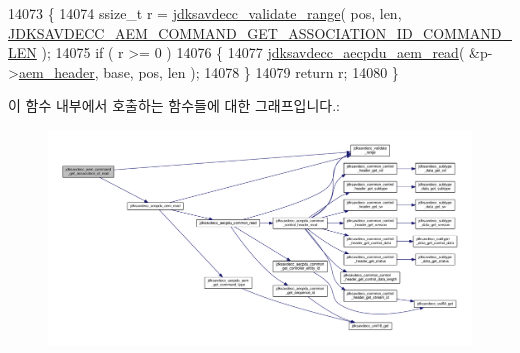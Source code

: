 \begin{DoxyCode}
14073 \{
14074     ssize\_t r = \hyperlink{group__util_ga9c02bdfe76c69163647c3196db7a73a1}{jdksavdecc\_validate\_range}( pos, len, 
      \hyperlink{group__command__get__association__id_ga71a17007be8c4f1ce7ac1c9f36a1f77e}{JDKSAVDECC\_AEM\_COMMAND\_GET\_ASSOCIATION\_ID\_COMMAND\_LEN} 
      );
14075     \textcolor{keywordflow}{if} ( r >= 0 )
14076     \{
14077         \hyperlink{group__aecpdu__aem_gae2421015dcdce745b4f03832e12b4fb6}{jdksavdecc\_aecpdu\_aem\_read}( &p->\hyperlink{structjdksavdecc__aem__command__get__association__id_ae1e77ccb75ff5021ad923221eab38294}{aem\_header}, base, pos, len );
14078     \}
14079     \textcolor{keywordflow}{return} r;
14080 \}
\end{DoxyCode}


이 함수 내부에서 호출하는 함수들에 대한 그래프입니다.\+:
\nopagebreak
\begin{figure}[H]
\begin{center}
\leavevmode
\includegraphics[width=350pt]{group__command__get__association__id_ga956fff2d7ed648c8b20a5b3825335c3c_cgraph}
\end{center}
\end{figure}


